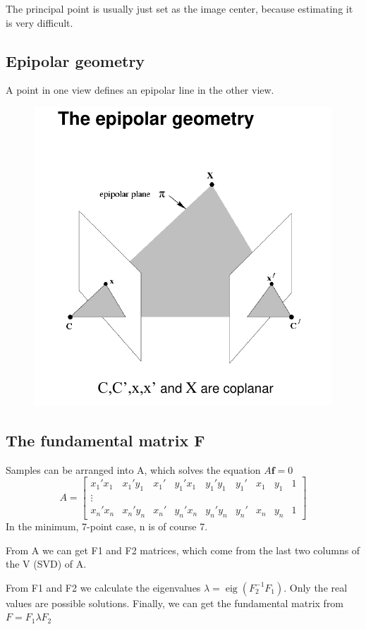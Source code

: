 The principal point is usually just set as the image center, because estimating
it is very difficult.

\subsection{Epipolar geometry}
A point in one view defines an epipolar line in the other view.
\begin{figure}[h]
    \centering
    \includegraphics[width=0.8\linewidth]{epipolar_geometry}
\end{figure}

\subsection{The fundamental matrix F}

Samples can be arranged into A, which solves the equation \( A \boldsymbol{f} =
0\)
\[ 
    A = \begin{bmatrix}
        x_1' x_1 & x_1' y_1 & x_1' & y_1' x_1 & y_1' y_1 & y_1' & x_1 & y_1 & 1
        \\ \vdots \\
        x_n' x_n & x_n' y_n & x_n' & y_n' x_n & y_n' y_n & y_n' & x_n & y_n & 1
    \end{bmatrix}
\]
In the minimum, 7-point case, n is of course 7.

From A we can get F1 and F2 matrices, which come from the last two columns of
the V (SVD) of A.

From F1 and F2 we calculate the eigenvalues \( \lambda =
\operatorname{eig}(F_2^{-1} F_1) \). Only the real values are possible
solutions. Finally, we can get the fundamental matrix from \( F = F_1 \lambda
F_2 \)

